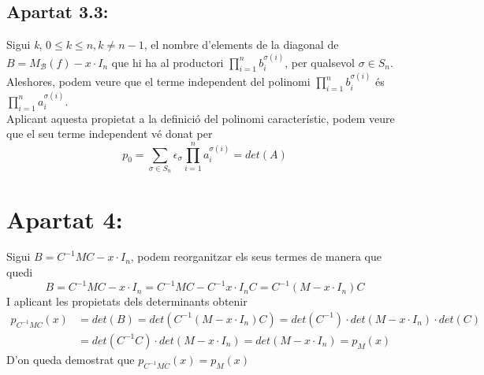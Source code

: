 \documentclass[a4paper, 11pt]{article}
\newcommand{\B}{\mathcal{B}}
\begin{document}
    \subsection*{Apartat 3.3:}
    Sigui \emph{k}, $0 \leq k \leq n, k \neq n-1$, el nombre d'elements de la diagonal de $B = M_\B(f) -x\cdot I_n$ que hi ha al productori $\prod_{i = 1}^n b_i^{\sigma (i)}$, per qualsevol $\sigma \in S_n$. Aleshores, podem veure que el terme independent del polinomi $\prod_{i = 1}^n b_i^{\sigma(i)}$ \'es $\prod_{i = 1}^n a_i^{\sigma(i)}$.\\
    Aplicant aquesta propietat a la definici\'o del polinomi caracter\'istic, podem veure que el seu terme independent v\'e donat per
    $$
        p_0 = \sum_{\sigma \in S_n}\epsilon_\sigma\prod_{i=1}^n a_i^{\sigma(i)} = det(A)
    $$
    \section*{Apartat 4:}
    Sigui $B = C^{-1}MC - x\cdot I_n$, podem reorganitzar els seus termes de manera que quedi
    $$
        B = C^{-1}MC - x\cdot I_n = C^{-1}MC - C^{-1}x\cdot I_n C = C^{-1}(M - x\cdot I_n)C
    $$
    I aplicant les propietats dels determinants obtenir
    \begin{align*}
        p_{C^{-1}MC}(x) &= det(B) = det(C^{-1}(M - x\cdot I_n)C) = det(C^{-1})\cdot det(M - x\cdot I_n)\cdot det(C) \\
        &= det(C^{-1}C)\cdot det(M - x\cdot I_n) = det(M - x\cdot I_n) = p_M(x)
    \end{align*}
    D'on queda demostrat que $p_{C^{-1}MC}(x) = p_M(x)$
\end{document}
